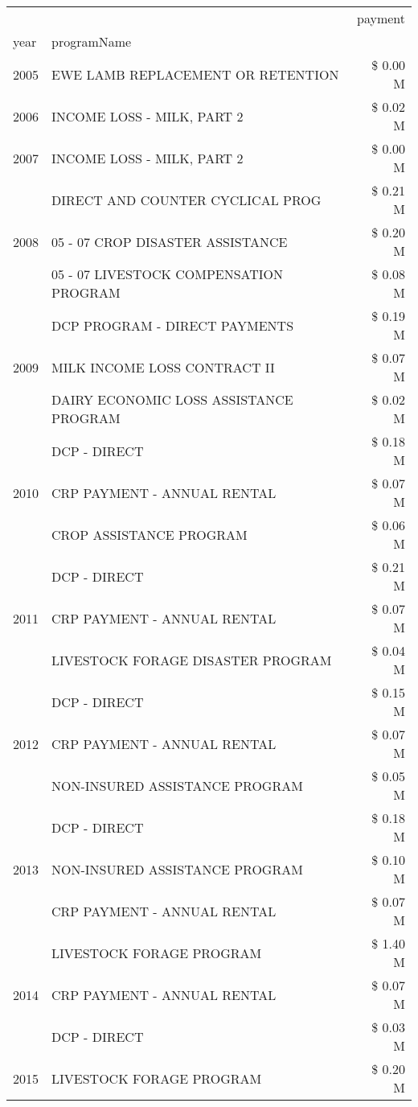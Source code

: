 \begin{tabular}{llr}
\toprule
 &  & payment \\
year & programName &  \\
\midrule
2005 & EWE LAMB REPLACEMENT OR RETENTION & \$ 0.00 M \\
\cline{1-3}
2006 & INCOME LOSS - MILK, PART 2 & \$ 0.02 M \\
\cline{1-3}
2007 & INCOME LOSS - MILK, PART 2 & \$ 0.00 M \\
\cline{1-3}
\multirow[t]{3}{*}{2008} & DIRECT AND COUNTER CYCLICAL PROG & \$ 0.21 M \\
 & 05 - 07 CROP DISASTER ASSISTANCE & \$ 0.20 M \\
 & 05 - 07 LIVESTOCK COMPENSATION PROGRAM & \$ 0.08 M \\
\cline{1-3}
\multirow[t]{3}{*}{2009} & DCP PROGRAM - DIRECT PAYMENTS & \$ 0.19 M \\
 & MILK INCOME LOSS CONTRACT II & \$ 0.07 M \\
 & DAIRY ECONOMIC LOSS ASSISTANCE PROGRAM & \$ 0.02 M \\
\cline{1-3}
\multirow[t]{3}{*}{2010} & DCP - DIRECT & \$ 0.18 M \\
 & CRP PAYMENT - ANNUAL RENTAL & \$ 0.07 M \\
 & CROP ASSISTANCE PROGRAM & \$ 0.06 M \\
\cline{1-3}
\multirow[t]{3}{*}{2011} & DCP - DIRECT & \$ 0.21 M \\
 & CRP PAYMENT - ANNUAL RENTAL & \$ 0.07 M \\
 & LIVESTOCK FORAGE DISASTER PROGRAM & \$ 0.04 M \\
\cline{1-3}
\multirow[t]{3}{*}{2012} & DCP - DIRECT & \$ 0.15 M \\
 & CRP PAYMENT - ANNUAL RENTAL & \$ 0.07 M \\
 & NON-INSURED ASSISTANCE PROGRAM & \$ 0.05 M \\
\cline{1-3}
\multirow[t]{3}{*}{2013} & DCP - DIRECT & \$ 0.18 M \\
 & NON-INSURED ASSISTANCE PROGRAM & \$ 0.10 M \\
 & CRP PAYMENT - ANNUAL RENTAL & \$ 0.07 M \\
\cline{1-3}
\multirow[t]{3}{*}{2014} & LIVESTOCK FORAGE PROGRAM & \$ 1.40 M \\
 & CRP PAYMENT - ANNUAL RENTAL & \$ 0.07 M \\
 & DCP - DIRECT & \$ 0.03 M \\
\cline{1-3}
\multirow[t]{3}{*}{2015} & LIVESTOCK FORAGE PROGRAM & \$ 0.20 M \\

\end{tabular}
